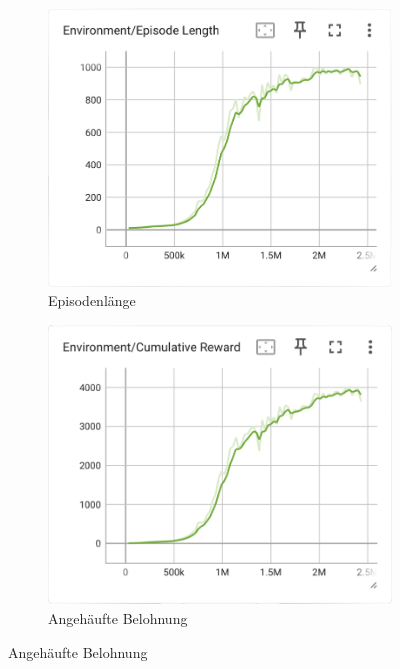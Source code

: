 \begin{figure}[H]
  \centering  
  \begin{subfigure}{.49\textwidth}
      \centering  
      \includegraphics[width=\textwidth]{img/126_episode_length}
      \caption{Episodenlänge}
      \label{fig:126_episode_length}
    \end{subfigure}
    \begin{subfigure}{.49\textwidth}
      \centering  
      \includegraphics[width=\textwidth]{img/126_cumulative_reward}
      \caption{Angehäufte Belohnung}
      \label{fig:126_cumulative_reward}

\end{subfigure}
\end{figure}
